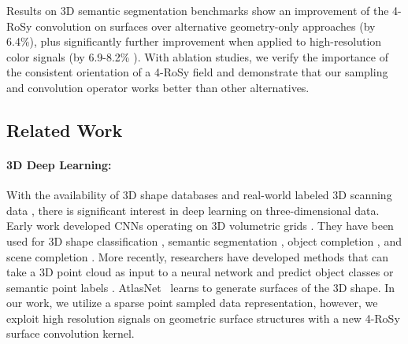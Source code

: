 Results on 3D semantic segmentation benchmarks show an improvement of the 4-RoSy convolution on surfaces over alternative geometry-only approaches (by 6.4\%), plus significantly further improvement when applied to high-resolution color signals (by 6.9-8.2\% ).  With ablation studies, we verify the importance of the consistent orientation of a 4-RoSy field and demonstrate that our sampling and convolution operator works better than other alternatives.

\subsection{Related Work}
\label{related:texturenet}
\paragraph*{3D Deep Learning:}
With the availability of 3D shape databases \cite{wu20153d,chang2015shapenet,song2017semantic} and real-world labeled 3D scanning data \cite{song2015sun,armeni2017joint,dai2017scannet,chang2017matterport3d}, there is significant interest in deep learning on three-dimensional data.   Early work developed CNNs operating on 3D volumetric grids \cite{wu20153d,maturana2015voxnet}.  They have been used for 3D shape classification  \cite{qi2016volumetric,riegler2017octnet}, semantic  segmentation \cite{dai2017scannet,dai2018scancomplete}, object completion \cite{dai2017shape}, and scene completion \cite{dai2018scancomplete}.   More recently, researchers have developed methods that can take a 3D point cloud as input to a neural network and predict object classes or semantic point labels \cite{qi2017pointnet,qi2017pointnet++,tatarchenko2018tangent,su2018splatnet,atzmon2018point}.  AtlasNet~\cite{groueix2018papier} learns to generate surfaces of the 3D shape.  In our work, we utilize a sparse point sampled data representation, however, we exploit high resolution signals on geometric surface structures with a new 4-RoSy surface convolution kernel.

